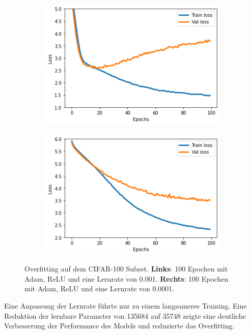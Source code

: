 \begin{figure}[H]
  \centering
  \vspace{1cm}
  \begin{subfigure}
    \centering
    \includegraphics[width=.48\textwidth]{resources/experiments/cifar_100_324_0001.png}
  \end{subfigure}
  \begin{subfigure}
    \centering
    \includegraphics[width=.48\textwidth]{resources/experiments/cifar_100_324_00001.png}
  \end{subfigure}

  \caption{Overfitting auf dem CIFAR-100 Subset. \textbf{Links}: 100 Epochen mit Adam, ReLU und eine Lernrate von 0.001. \textbf{Rechts}:
  100 Epochen mit Adam, ReLU und eine Lernrate von 0.0001.}
  \label{image:gute-ergebnisse-cifar}
\end{figure}

Eine Anpassung der Lernrate führte nur zu einem langsameres Training. Eine Reduktion der lernbare Parameter von 135684 auf 35748 zeigte 
eine deutliche Verbesserung der Performance des Models und reduzierte das Overfitting.

